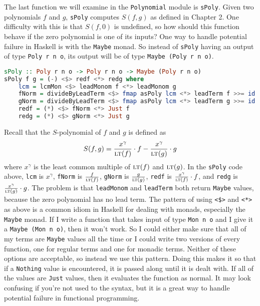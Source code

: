 \documentclass[MS, xcolor=dvipsnames]{wfuthesis}
\newcommand{\LT}{\ensuremath{\text{\sc lt}}}
\theoremstyle{definition}
\begin{document}
The last function we will examine in the \lstinline{Polynomial} module is \lstinline{sPoly}. Given two polynomials $f$ and $g$, \lstinline{sPoly} computes $S(f,g)$ as defined in Chapter 2. One difficulty with this is that $S(f,0)$ is undefined, so how should this function behave if the zero polynomial is one of its inputs? One way to handle potential failure in Haskell is with the \lstinline{Maybe} monad. So instead of \lstinline{sPoly} having an output of type \lstinline{Poly r n o}, its output will be of type \lstinline{Maybe (Poly r n o)}. 
\begin{lstlisting}[language=Haskell]
sPoly :: Poly r n o -> Poly r n o -> Maybe (Poly r n o)
sPoly f g = (-) <$> redf <*> redg where
    lcm = lcmMon <$> leadMonom f <*> leadMonom g
    fNorm = divideByLeadTerm <$> fmap asPoly lcm <*> leadTerm f >>= id
    gNorm = divideByLeadTerm <$> fmap asPoly lcm <*> leadTerm g >>= id
    redf = (*) <$> fNorm <*> Just f
    redg = (*) <$> gNorm <*> Just g
\end{lstlisting}
Recall that the $S$-polynomial of $f$ and $g$ is defined as 
\[ S(f,g) = \frac{x^\gamma}{\LT(f)} \cdot f - \frac{x^\gamma}{\LT(g)} \cdot g \]
where $x^\gamma$ is the least common multiple of $\LT(f)$ and $\LT(g)$. In the \lstinline{sPoly} code above, \lstinline{lcm} is $x^\gamma$, \lstinline{fNorm} is $\frac{f}{\LT(f)}$, \lstinline{gNorm} is $\frac{g}{\LT(g)}$, \lstinline{redf} is $\frac{x^\gamma}{\LT(f)} \cdot f$, and \lstinline{redg} is $\frac{x^\gamma}{\LT(g)} \cdot g$. The problem is that \lstinline{leadMonom} and \lstinline{leadTerm} both return \lstinline{Maybe} values, because the zero polynomial has no lead term. The pattern of using \lstinline{<$>} and \lstinline{<*>} as above is a common idiom in Haskell for dealing with monads, especially the \lstinline{Maybe} monad. If I write a function that takes input of type \lstinline{Mon n o} and I give it a \lstinline{Maybe (Mon n o)}, then it won't work. So I could either make sure that all of my terms are \lstinline{Maybe} values all the time or I could write two versions of every function, one for regular terms and one for monadic terms. Neither of these options are acceptable, so instead we use this pattern. Doing this makes it so that if a \lstinline{Nothing} value is encountered, it is passed along until it is dealt with. If all of the values are \lstinline{Just} values, then it evaluates the function as normal. It may look confusing if you're not used to the syntax, but it is a great way to handle potential failure in functional programming. \par 
\end{document}
